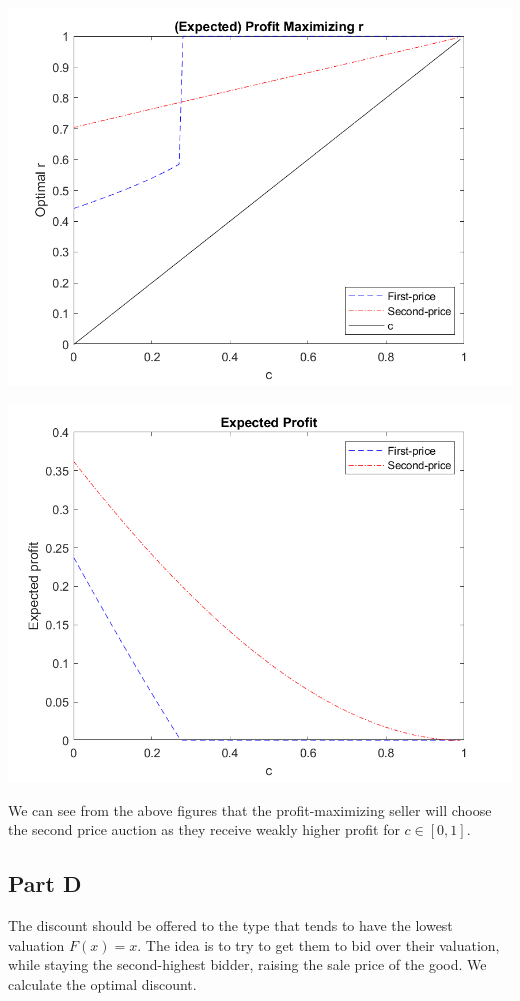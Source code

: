 \documentclass[11pt]{article} %
\begin{document}
\includegraphics{argmax}

\includegraphics{profit}

We can see from the above figures that the profit-maximizing seller will choose the second price auction as they receive weakly higher profit for $c\in [0,1]$.

\subsection{Part D}
The discount should be offered to the type that tends to have the lowest valuation $F(x) = x$. The idea is to try to get them to bid over their valuation, while staying the second-highest bidder, raising the sale price of the good. We calculate the optimal discount.
\end{document}
